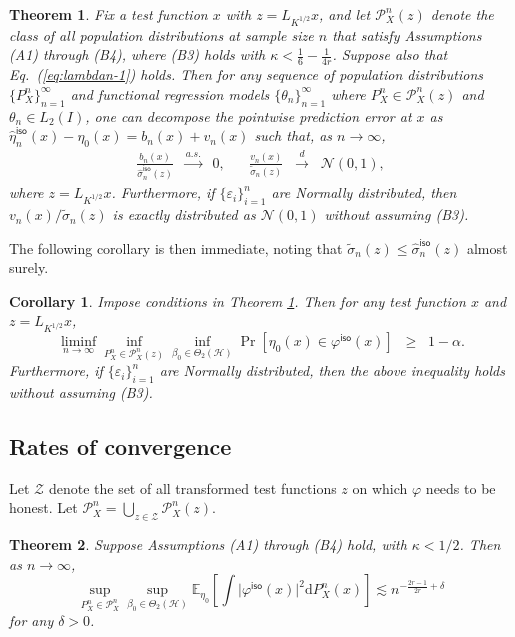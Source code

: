 \documentclass[aos]{imsart}
\renewcommand{\hat}{\widehat}
\renewcommand{\tilde}{\widetilde}
\newcommand{\ud}{\mathrm d}
\newcommand{\mH}{\mathcal H}
\newcommand{\iso}{\mathsf{iso}}
\theoremstyle{plain}
\newtheorem{theorem}{Theorem}[section]
\newtheorem{corollary}{Corollary}[section]
\theoremstyle{definition}
\theoremstyle{definition}
\begin{document}
\begin{theorem}
Fix a test function $x$ with $z=L_{K^{1/2}}x$, and let $\mathcal P_X^n(z)$ denote the class of all population distributions at sample size $n$ that satisfy
Assumptions (A1) through (B4), where (B3) holds with $\kappa<\frac{1}{6}-\frac{1}{4r}$. Suppose also that Eq.~(\ref{eq:lambdan-1}) holds. Then
for any sequence of population distributions $\{P_X^n\}_{n=1}^{\infty}$ and functional regression models $\{\theta_n\}_{n=1}^{\infty}$ where $P_X^n\in\mathcal P_X^n(z)$ and $\theta_n\in L_2(I)$, one can decompose the pointwise prediction error at $x$ as $\hat\eta_n^\iso(x)-\eta_0(x)=b_n(x)+v_n(x)$ such that, as $n\to\infty$,
\begin{align*}
\frac{b_n(x)}{\hat\sigma_n^\iso(z)}\;\;\overset{a.s.}{\to}\;\; 0,\;\;\;\;\;\;\frac{v_n(x)}{\tilde\sigma_n(z)}\;\;\overset{d}{\to}\;\;\mathcal N(0,1),
\end{align*}
where $z=L_{K^{1/2}}x$.
Furthermore, if $\{\varepsilon_i\}_{i=1}^n$ are Normally distributed, then $v_n(x)/\tilde\sigma_n(z)$ is exactly distributed as $\mathcal N(0,1)$ without assuming (B3).
\label{thm:isokrr-limiting}
\end{theorem}

The following corollary is then immediate, noting that $\tilde\sigma_n(z)\leq\hat\sigma_n^\iso(z)$ almost surely.
\begin{corollary}
Impose conditions in Theorem \ref{thm:isokrr-limiting}. Then for any test function $x$
and $z=L_{K^{1/2}}x$,
$$
\liminf_{n\to\infty}\inf_{P_X^n\in\mathcal P_X^n(z)}\inf_{\beta_0\in\Theta_2(\mH)}\Pr[\eta_0(x)\in\varphi^\iso(x)]\;\;\geq\;\; 1-\alpha.
$$
Furthermore, if $\{\varepsilon_i\}_{i=1}^n$ are Normally distributed, then the above inequality holds without assuming (B3).
\label{cor:isokrr-ci}
\end{corollary}

\subsection{Rates of convergence}

Let $\mathcal Z$ denote the set of all transformed
test functions $z$ on which $\varphi$ needs
to be honest. Let $\mathcal P_X^n = \bigcup_{z\in\mathcal Z}\mathcal P_X^n(z)$.

\begin{theorem}
Suppose Assumptions (A1) through (B4) hold, with $\kappa<1/2$. Then as $n\to\infty$,
\begin{equation}
\sup_{P_X^n\in\mathcal P_X^n}\sup_{\beta_0\in\Theta_2(\mH)}\mathbb E_{\eta_0}\left[\int\big|\varphi^\iso(x)\big|^2\ud P_X^n(x)\right]\lesssim n^{-\frac{2r-1}{2r}+\delta}
\label{eq:simple-validity}
\end{equation}
for any $\delta>0$.
\label{thm:isokrr-rates}
\end{theorem}
\end{document}
